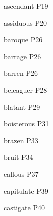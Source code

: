 \documentclass[10pt, a4paper, twocolumn]{article}
\begin{document}
    ascendant \hfill P19 

    assiduous \hfill P20 

    baroque \hfill P26 

    barrage \hfill P26 

    barren \hfill P26 

    beleaguer \hfill P28 

    blatant \hfill P29 

    boisterous \hfill P31

    brazen \hfill P33
    
    bruit \hfill P34

    callous \hfill P37 

    capitulate \hfill P39 

    castigate \hfill P40 
\end{document}
